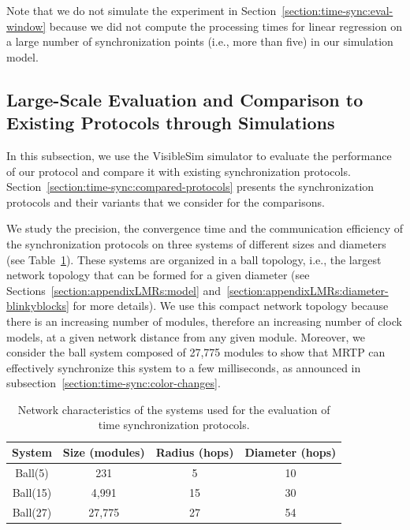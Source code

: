 Note that we do not simulate the experiment in Section~\ref{section:time-sync:eval-window} because we did not compute the processing times for linear regression on a large number of synchronization points (i.e., more than five) in our simulation model.

\subsection{Large-Scale Evaluation and Comparison to Existing Protocols through Simulations}
\label{section:time-sync:large-scale-evaluation}

In this subsection, we use the VisibleSim simulator to evaluate the performance of our protocol and compare it with existing synchronization protocols. Section~\ref{section:time-sync:compared-protocols} presents the synchronization protocols and their variants that we consider for the comparisons.

We study the precision, the convergence time and the communication efficiency of the synchronization protocols on three systems of different sizes and diameters (see Table~\ref{table:time-sync:balls}). These systems are organized in a ball topology, i.e., the largest network topology that can be formed for a given diameter (see Sections~\ref{section:appendixLMRs:model} and~\ref{section:appendixLMRs:diameter-blinkyblocks} for more details). We use this compact network topology because there is an increasing number of modules, therefore an increasing number of clock models, at a given network distance from any given module. Moreover, we consider the ball system composed of 27,775 modules to show that MRTP can effectively synchronize this system to a few milliseconds, as announced in subsection~\ref{section:time-sync:color-changes}.

\begin{table}[h!]
	\small
	\centering
	\begin{tabular}{|c|c|c|c|}
		\hline
		System & Size (modules) & Radius (hops) & Diameter (hops)\\
		\hline
		Ball(5) & 231 & 5 & 10 \\
		\hline
		Ball(15) & 4,991 & 15 & 30 \\
		\hline
		Ball(27) & 27,775 & 27 & 54 \\
		\hline
	\end{tabular}
	\caption{Network characteristics of the systems used for the evaluation of time synchronization protocols.\label{table:time-sync:balls}}
\end{table}

